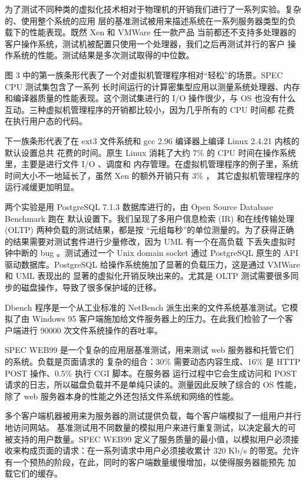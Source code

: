 为了测试不同种类的虚拟化技术相对于物理机的开销我们进行了一系列实验。复杂的、使用整个系统的应用
层的基准测试被用来描述系统在一系列服务器类型的负载下的性能表现。既然 Xen 和 VMWare 任一款产品
当前都还不支持多处理器的客户操作系统，测试机被配置只使用一个处理器，我们之后再测试并行的客户
操作系统的性能。测试结果是多次测试取得的中位数。

图 3 中的第一族条形代表了一个对虚拟机管理程序相对“轻松”的场景。SPEC CPU 测试集包含了一系列
长时间运行的计算密集型应用以测量系统处理器、内存和编译器质量的性能表现。这个测试集进行的 I/O
操作很少，与 OS 也没有什么互动。三种虚拟机管理程序的开销都比较小，因为几乎所有的 CPU 时间都
花费在执行用户态的代码。

下一族条形代表了在 ext3 文件系统和 gcc 2.96 编译器上编译 Linux 2.4.21 内核的默认设置总共
花费的时间。原生 Linux 消耗了大约 7\% 的 CPU 时间在操作系统里，主要是进行文件 I/O 、调度和
内存管理。在虚拟机管理程序的例子里，系统时间大小不一地延长了，虽然 Xen 的额外开销只有 3\% ，
其它虚拟机管理程序的运行减缓更加明显。

两个实验是用 PostgreSQL 7.1.3 数据库进行的，由 Open Source Database Benchmark 跑在
默认设置下。我们呈现了多用户信息检索 (IR) 和在线传输处理 (OLTP) 两种负载的测试结果，都是按
“元组每秒”的单位测量的。为了获得正确的结果需要对测试套件进行少量修改，因为 UML 有一个在高负载
下丢失虚拟时钟中断的 bug 。测试通过一个 Unix domain socket 通过 PostgreSQL 原生的 API
驱动数据库。PostgreSQL 给操作系统施加了显著的负载压力，这是通过 VMWare 和 UML 表现出的
显著的虚拟化开销反映出来的。尤其是 OLTP 测试需要很多同步的磁盘操作，导致了很多保护域的迁移。

Dbench 程序是一个从工业标准的 NetBench 派生出来的文件系统基准测试。它模拟了由 Windows 95
客户端施加给文件服务器上的压力。在此我们检验了一个客户端进行 90000 次文件系统操作的吞吐率。

SPEC WEB99 是一个复杂的应用层基准测试，用来测试 web 服务器和托管它们的系统。负载是页面请求的
复杂的组合：30\% 需要动态内容生成、16\% 是 HTTP POST 操作、0.5\% 执行 CGI 脚本。在服务器
运行过程中它会生成访问和 POST 请求的日志，所以磁盘负载并不是单纯只读的。测量因此反映了综合的
OS 性能，除了 web 服务器本身的性能之外还包括文件系统和网络的性能。

多个客户端机器被用来为服务器的测试提供负载，每个客户端模拟了一组用户并行地访问网站。
基准测试用不同数量的模拟用户来进行重复测试，以决定最大的可被支持的用户数量。SPEC WEB99
定义了服务质量的最小值，以模拟用户必须接收来构成页面的请求：在一系列请求中用户必须接收累计
320 Kb/s 的带宽。允许有一个预热的阶段，在此，同时的客户端数量缓慢增加，以使得服务器能预先
加载它们的缓存。

